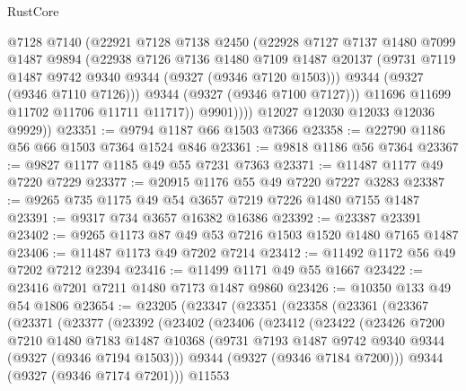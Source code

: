 \begin{lexlean}{RustCore}
\begin{coremodule}
                  @7128
                  @7140
                  (@22921
                    @7128
                    @7138
                    @2450
                    (@22928
                      @7127
                      @7137
                      @1480
                      @7099
                      @1487
                      @9894
                      (@22938
                        @7126
                        @7136
                        @1480
                        @7109
                        @1487
                        @20137
                        (@9731 @7119 @1487 @9742 @9340 @9344 (@9327 (@9346 @7120 @1503)))
                        @9344
                        (@9327 (@9346 @7110 @7126)))
                      @9344
                      (@9327 (@9346 @7100 @7127)))
                    @11696
                    @11699
                    @11702
                    @11706
                    @11711
                    @11717))
                @9901))))
        @12027
        @12030
        @12033
        @12036
        @9929))
@23351 := @9794 @1187 @66 @1503 @7366
@23358 := @22790 @1186 @56 @66 @1503 @7364 @1524 @846
@23361 := @9818 @1186 @56 @7364
@23367 := @9827 @1177 @1185 @49 @55 @7231 @7363
@23371 := @11487 @1177 @49 @7220 @7229
@23377 := @20915 @1176 @55 @49 @7220 @7227 @3283
@23387 := @9265 @735 @1175 @49 @54 @3657 @7219 @7226 @1480 @7155 @1487
@23391 := @9317 @734 @3657 @16382 @16386
@23392 := @23387 @23391
@23402 := @9265 @1173 @87 @49 @53 @7216 @1503 @1520 @1480 @7165 @1487
@23406 := @11487 @1173 @49 @7202 @7214
@23412 := @11492 @1172 @56 @49 @7202 @7212 @2394
@23416 := @11499 @1171 @49 @55 @1667
@23422 := @23416 @7201 @7211 @1480 @7173 @1487 @9860
@23426 := @10350 @133 @49 @54 @1806
@23654 := @23205
    (@23347
      (@23351
        (@23358
          (@23361
            (@23367
              (@23371
                (@23377
                  (@23392
                    (@23402
                      (@23406
                        (@23412
                          (@23422
                            (@23426
                              @7200
                              @7210
                              @1480
                              @7183
                              @1487
                              @10368
                              (@9731 @7193 @1487 @9742 @9340 @9344 (@9327 (@9346 @7194 @1503)))
                              @9344
                              (@9327 (@9346 @7184 @7200)))
                            @9344
                            (@9327 (@9346 @7174 @7201)))
                          @11553

\end{coremodule}
\end{lexlean}
